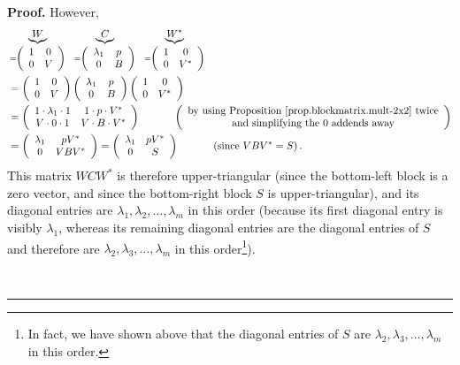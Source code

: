 \documentclass[numbers=enddot,12pt,final,onecolumn,notitlepage]{scrartcl}%
\numberwithin{exer}{subsection}
\theoremstyle{definition}
\newenvironment{proof}[1][Proof]{\noindent\textbf{#1.} }{\ \rule{0.5em}{0.5em}}
\begin{document}
\begin{proof}
However,%
\begin{align*}
&  \underbrace{W}_{=\left(
\begin{array}
[c]{cc}%
1 & 0\\
0 & V
\end{array}
\right)  }\ \ \underbrace{C}_{=\left(
\begin{array}
[c]{cc}%
\lambda_{1} & p\\
0 & B
\end{array}
\right)  }\ \ \underbrace{W^{\ast}}_{=\left(
\begin{array}
[c]{cc}%
1 & 0\\
0 & V^{\ast}%
\end{array}
\right)  }\\
&  =\left(
\begin{array}
[c]{cc}%
1 & 0\\
0 & V
\end{array}
\right)  \left(
\begin{array}
[c]{cc}%
\lambda_{1} & p\\
0 & B
\end{array}
\right)  \left(
\begin{array}
[c]{cc}%
1 & 0\\
0 & V^{\ast}%
\end{array}
\right) \\
&  =\left(
\begin{array}
[c]{cc}%
1\cdot\lambda_{1}\cdot1 & 1\cdot p\cdot V^{\ast}\\
V\cdot0\cdot1 & V\cdot B\cdot V^{\ast}%
\end{array}
\right)  \ \ \ \ \ \ \ \ \ \ \left(
\begin{array}
[c]{c}%
\text{by using Proposition \ref{prop.blockmatrix.mult-2x2} twice}\\
\text{and simplifying the }0\text{ addends away}%
\end{array}
\right) \\
&  =\left(
\begin{array}
[c]{cc}%
\lambda_{1} & pV^{\ast}\\
0 & VBV^{\ast}%
\end{array}
\right)  =\left(
\begin{array}
[c]{cc}%
\lambda_{1} & pV^{\ast}\\
0 & S
\end{array}
\right)  \ \ \ \ \ \ \ \ \ \ \left(  \text{since }VBV^{\ast}=S\right)  .
\end{align*}
This matrix $WCW^{\ast}$ is therefore upper-triangular (since the bottom-left
block is a zero vector, and since the bottom-right block $S$ is
upper-triangular), and its diagonal entries are $\lambda_{1},\lambda
_{2},\ldots,\lambda_{m}$ in this order (because its first diagonal entry is
visibly $\lambda_{1}$, whereas its remaining diagonal entries are the diagonal
entries of $S$ and therefore are $\lambda_{2},\lambda_{3},\ldots,\lambda_{m}$
in this order\footnote{In fact, we have shown above that the diagonal entries
of $S$ are $\lambda_{2},\lambda_{3},\ldots,\lambda_{m}$ in this order.}).


\end{proof}
\end{document}
